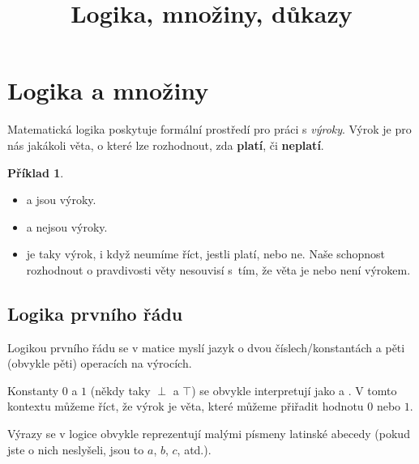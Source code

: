 \documentclass[a4paper,11pt]{article}
\title{\Huge\textsf{Logika, množiny, důkazy}\\
 \Large\textsf{}
 \author{}
 \date{}
}
\theoremstyle{definition}
\newtheorem{exm}[thm]{Příklad}
\theoremstyle{plain}
\begin{document}
\maketitle
\thispagestyle{fancy}

\section{Logika a množiny}
\label{sec:logika-a-mnoziny}

Matematická logika poskytuje formální prostředí pro práci s \emph{výroky}. Výrok
je pro nás jakákoli věta, o které lze rozhodnout, zda \textbf{platí}, či
\textbf{neplatí}.

\begin{exm}\hfill
 \begin{itemize}
  \item {} a  jsou výroky.
  \item {} a  nejsou výroky.
  \item {} je taky výrok, i když neumíme říct,
   jestli platí, nebo ne. Naše schopnost rozhodnout o pravdivosti věty nesouvisí
   s~tím, že věta je nebo není výrokem.
 \end{itemize}
\end{exm}

\subsection{Logika prvního řádu}
\label{ssec:logika-prvniho-radu}

Logikou prvního řádu se v matice myslí jazyk o dvou číslech/konstantách a pěti
(obvykle pěti) operacích na výrocích.

Konstanty $0$ a $1$ (někdy taky $\perp$ a $\top$) se obvykle interpretují jako
 a . V tomto kontextu můžeme říct, že výrok je věta, které
můžeme přiřadit hodnotu $0$ nebo $1$.

Výrazy se v logice obvykle reprezentují malými písmeny latinské abecedy
(pokud jste o nich neslyšeli, jsou to $a$, $b$, $c$, atd.).  
\end{document}

